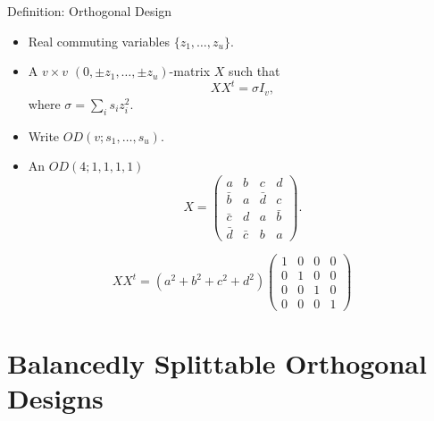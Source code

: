 \documentclass{beamer}
\begin{document}
\begin{frame}

  \begin{block}{Definition: Orthogonal Design}
    \begin{itemize}
    \item Real commuting variables $\{z_1, \dots, z_u\}$.
    \item A $v \times v$ $(0,\pm z_1, \dots, \pm z_u)$-matrix $X$ such that
      \[
        XX^t = \sigma I_v,
      \]
      where $\sigma = \sum_i s_iz_i^2$.
    \item Write $OD(v; s_1, \dots, s_u)$.
    \end{itemize}
  \end{block}
  
\end{frame}

\begin{frame}

  \begin{itemize}
  \item An $OD(4;1,1,1,1)$
    \[
      X = 
      \begin{pmatrix}
        a & b & c & d \\
        \bar b & a & \bar d & c \\
        \bar c & d & a & \bar b \\
        \bar d & \bar c & b & a
      \end{pmatrix}.
    \]
  \end{itemize}
  
\end{frame}

\begin{frame}

  \[
    XX^t = (a^2+b^2+c^2+d^2)
    \begin{pmatrix}
      1 & 0 & 0 & 0 \\
      0 & 1 & 0 & 0 \\
      0 & 0 & 1 & 0 \\
      0 & 0 & 0 & 1
    \end{pmatrix}
  \]
  
\end{frame}


\section{Balancedly Splittable Orthogonal Designs}
\end{document}
